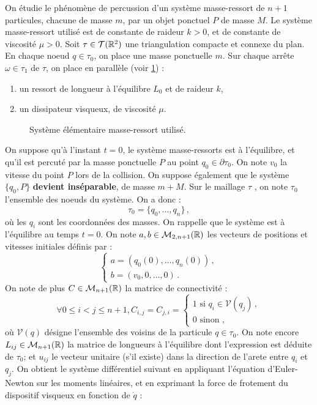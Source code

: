 On étudie le phénomène de percussion d’un système masse-ressort de $n + 1$ particules, chacune de masse $m$, par un objet ponctuel $P$ de masse $M$. Le système masse-ressort utilisé est de constante de raideur $k>0$, et de constante de viscosité $\mu>0$. Soit $\tau \in \mathcal{T} (\mathbb{R}^2)$ une triangulation compacte et connexe du plan. En chaque noeud $q \in \tau_0$, on place une masse ponctuelle $m$. Sur chaque arrête $\omega \in \tau_1$ de $\tau$, on place en parallèle (voir \cref{fig:masseressort}) :
\begin{enumerate}
    \item un ressort de longueur à l’équilibre $L_0$ et de raideur $k$,\
    \item un dissipateur visqueux, de viscosité $\mu$.
\end{enumerate}
\begin{figure}[!h]
    \centering
    \caption{Système élémentaire masse-ressort utilisé.}
    \label{fig:masseressort}
\end{figure}
On suppose qu’à l’instant $t = 0$, le système masse-ressorts est à l’équilibre, et qu’il est percuté par la masse ponctuelle $P$ au point $q_0 \in \partial\tau_0$. On note $v_0$ la vitesse du point $P$ lors de la collision. On suppose également que le système $\{q_0, P\}$ \textbf{devient inséparable}, de masse $m + M$.
Sur le maillage $\tau$ , on note $\tau_0$ l’ensemble des noeuds du système. On a donc :
$$\tau_0 = \{q_0, . . . , q_n \} \,,$$ où les $q_i$ sont les coordonnées des masses. On rappelle que le système est à l’équilibre au temps $t = 0$. On note $a, b \in \mathcal{M}_{2,n+1} (\mathbb{R})$ les vecteurs de positions et vitesses initiales définis
par :
$$
\begin{cases}
    a = (q_0(0), \ldots, q_n(0)) \,, \\
    b = (v_0,0,\ldots,0) \,.
\end{cases}
$$
On note de plus $C \in \mathcal{M}_{n+1}(\mathbb{R})$ la matrice de connectivité :
$$
∀0 \leq i < j \leq n + 1, C_{i,j} = C_{j,i} =
\begin{cases}
    1 \text{ si } q_i \in \mathcal{V}(q_j) \,, \\
    0 \text{ sinon },
\end{cases}
$$
où $\mathcal{V}(q)$ désigne l’ensemble des voisins de la particule $q \in \tau_0$. On note encore $L_{ij} \in \mathcal{M}_{n+1} (\mathbb{R})$ la matrice de longueurs à l’équilibre dont l’expression est déduite de $τ_0$; et $u_{ij}$ le vecteur unitaire (s'il existe) dans la direction de l'arete entre $q_i$ et $q_j$. On obtient le système différentiel suivant en appliquant l'équation d'Euler-Newton sur les moments linéaires, et en exprimant la force de frotement du dispositif visqueux en fonction de $\dot q$ :

